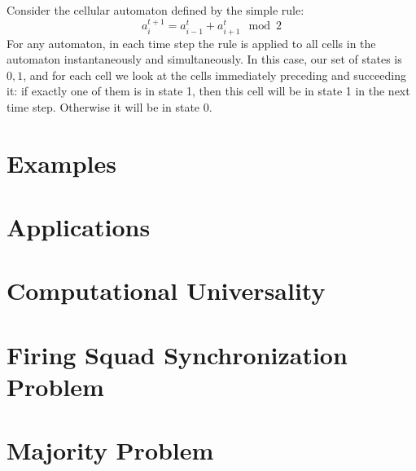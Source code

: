 \documentclass[11pt,a4paper]{article}
\begin{document}
    Consider the cellular automaton defined by the simple rule:
    $$ a_{i}^{t+1} = a_{i-1}^{t} + a_{i+1}^{t} \mod{2} $$
    For any automaton, in each time step the rule is applied to all cells in the
    automaton instantaneously and simultaneously. In this case, our set of
    states is ${0,1}$, and for each cell we look at the cells immediately
    preceding and succeeding it: if exactly one of them is in state 1, then this
    cell will be in state 1 in the next time step. Otherwise it will be in state
    0. 

\section{Examples}
\section{Applications}
\section{Computational Universality}
\section{Firing Squad Synchronization Problem}
\section{Majority Problem}
\section{}
\end{document}
